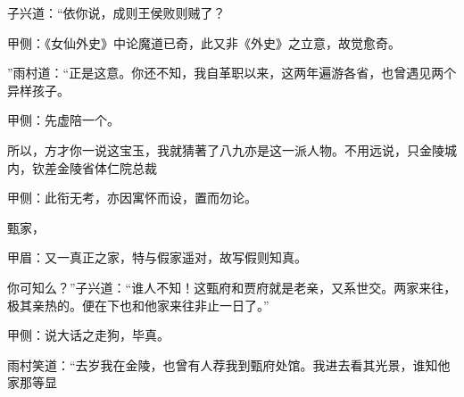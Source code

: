 \begin{parag}
    子兴道：“依你说，成则王侯败则贼了？\begin{note}甲侧：《女仙外史》中论魔道已奇，此又非《外史》之立意，故觉愈奇。\end{note}”雨村道：“正是这意。你还不知，我自革职以来，这两年遍游各省，也曾遇见两个异样孩子。\begin{note}甲侧：先虚陪一个。\end{note}所以，方才你一说这宝玉，我就猜著了八九亦是这一派人物。不用远说，只金陵城内，钦差金陵省体仁院总裁\begin{note}甲侧：此衔无考，亦因寓怀而设，置而勿论。\end{note}甄家，\begin{note}甲眉：又一真正之家，特与假家遥对，故写假则知真。\end{note}你可知么？”子兴道：“谁人不知！这甄府和贾府就是老亲，又系世交。两家来往，极其亲热的。便在下也和他家来往非止一日了。”\begin{note}甲侧：说大话之走狗，毕真。\end{note}雨村笑道：“去岁我在金陵，也曾有人荐我到甄府处馆。我进去看其光景，谁知他家那等显
\end{parag}
